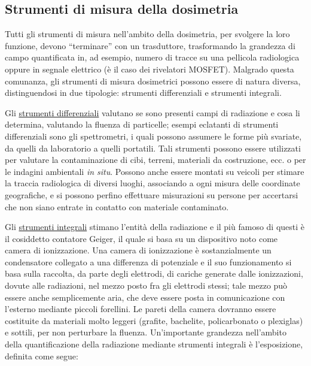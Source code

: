 \documentclass{report}
\newcommand{\virgolette}[1]{``#1''}
\numberwithin{equation}{section}
\numberwithin{figure}{section}
\begin{document}
\subsection{Strumenti di misura della dosimetria}
Tutti gli strumenti di misura nell'ambito della dosimetria, per svolgere la loro funzione, devono \virgolette{terminare} con un trasduttore, trasformando la grandezza di campo quantificata in, ad esempio, numero di tracce su una pellicola radiologica oppure in segnale elettrico (è il caso dei rivelatori MOSFET). Malgrado questa comunanza, gli strumenti di misura dosimetrici possono essere di natura diversa, distinguendosi in due tipologie: strumenti differenziali e strumenti integrali.

Gli \underline{strumenti differenziali} valutano se sono presenti campi di radiazione e cosa li determina, valutando la fluenza di particelle; esempi eclatanti di strumenti differenziali sono gli spettrometri, i quali possono assumere le forme più svariate, da quelli da laboratorio a quelli portatili. Tali strumenti possono essere utilizzati per valutare la contaminazione di cibi, terreni, materiali da costruzione, ecc. o per le indagini ambientali \textit{in situ}. Possono anche essere montati su veicoli per stimare la traccia radiologica di diversi luoghi, associando a ogni misura delle coordinate geografiche, e si possono perfino effettuare misurazioni su persone per accertarsi che non siano entrate in contatto con materiale contaminato.

Gli \underline{strumenti integrali} stimano l'entità della radiazione e il più famoso di questi è il cosiddetto contatore Geiger, il quale si basa su un dispositivo noto come camera di ionizzazione. Una camera di ionizzazione è sostanzialmente un condensatore collegato a una differenza di potenziale e il suo funzionamento si basa sulla raccolta, da parte degli elettrodi, di cariche generate dalle ionizzazioni, dovute alle radiazioni, nel mezzo posto fra gli elettrodi stessi; tale mezzo può essere anche semplicemente aria, che deve essere posta in comunicazione con l’esterno mediante piccoli forellini. Le pareti della camera dovranno essere costituite da materiali molto leggeri (grafite, bachelite, policarbonato o plexiglas) e sottili, per non perturbare la fluenza. Un'importante grandezza nell'ambito della quantificazione della radiazione mediante strumenti integrali è l'esposizione, definita come segue:
\end{document}
